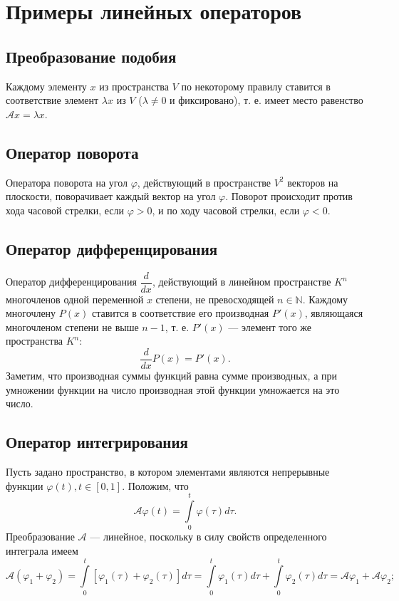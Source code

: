 \documentclass[a5paper, 11pt]{extbook}
\theoremstyle{definition}
\theoremstyle{definition}
\begin{document}
\section{Примеры линейных операторов}

\subsection{Преобразование подобия}

Каждому элементу \(x\) из пространства \(V\) по некоторому правилу ставится в соответствие элемент \(\lambda x\) из \(V\) (\(\lambda \neq 0\) и фиксировано), т. е. имеет место равенство \(\mathcal{A} x = \lambda x\).

\subsection{Оператор поворота}

Оператора поворота на угол \(\varphi\), действующий в пространстве \(V^2\) векторов на плоскости, поворачивает каждый вектор на угол \(\varphi\). Поворот происходит против хода часовой стрелки, если \(\varphi > 0\), и по ходу часовой стрелки, если \(\varphi < 0\).

\subsection{Оператор дифференцирования}

Оператор дифференцирования \(\dfrac{d}{dx}\), действующий в линейном пространстве \(K^n\) многочленов одной переменной \(x\) степени, не превосходящей \(n \in \mathbb{N}\). Каждому многочлену \(P(x)\) ставится в соответствие его производная \(P'(x)\), являющаяся многочленом степени не выше \(n - 1\), т. е. \(P'(x)\) — элемент того же пространства \(K^n\):
\[
    \frac{d}{dx} P(x) = P'(x).
\]
Заметим, что производная суммы функций равна сумме производных, а при умножении функции на число производная этой функции умножается на это число.

\subsection{Оператор интегрирования}

Пусть задано пространство, в котором элементами являются непрерывные функции \(\varphi(t), t \in [0, 1]\). Положим, что
\[
    \mathcal{A} \varphi(t) = \int\limits_0^t \varphi(\tau) d\tau.
\]
Преобразование \(\mathcal{A}\) — линейное, поскольку в силу свойств определенного интеграла имеем
\[
    \mathcal{A} (\varphi_1 + \varphi_2) =
    \int\limits_0^t [\varphi_1(\tau) + \varphi_2(\tau)] d\tau =
    \int\limits_0^t \varphi_1(\tau) d\tau + \int\limits_0^t \varphi_2(\tau) d\tau =
    \mathcal{A} \varphi_1 + \mathcal{A} \varphi_2;
\]
\end{document}
